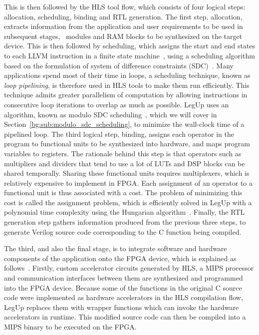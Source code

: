 This is then followed by the HLS tool flow, which consists of four logical
steps: allocation, scheduling, binding and RTL generation.  The first
step, allocation, extracts information from the application and user
requirements to be used in subsequent stages, \eg~modules and RAM blocks to
be synthesized on the target device.  This is then followed by scheduling,
which assigns the start and end states to each LLVM instruction in a
finite state machine~\cite{legup}, using a scheduling algorithm based on
the formulation of system of difference constraints (SDC)~\cite{legup,
canis13, cong06}.  Many applications spend most of their time in loops, a
scheduling technique, known as \emph{loop pipelining}, is therefore used
in HLS tools to make them run efficiently.  This technique admits greater
parallelism of computation by allowing instructions in consecutive loop
iterations to overlap as much as possible.  LegUp uses an algorithm,
known as modulo SDC scheduling~\cite{canis14}, which we will cover in
Section~\ref{bg:sub:modulo_sdc_scheduling}, to minimize the wall-clock time
of a pipelined loop.  The third logical step, binding, assigns each operator
in the program to functional units to be synthesized into hardware, and maps
program variables to registers.  The rationale behind this step is that
operators such as multipliers and dividers that tend to use a lot of LUTs and
DSP blocks can be shared temporally.  Sharing these functional units requires
multiplexers, which is relatively expensive to implement in FPGA\@.  Each
assignment of an operator to a functional unit is thus associated with a cost.
The problem of minimizing this cost is called the assignment problem, which
is efficiently solved in LegUp with a polynomial time complexity using the
Hungarian algorithm~\cite{canis13, kuhn10}.  Finally, the RTL generation step
gathers information produced from the previous three steps, to generate Verilog
source code corresponding to the C function being compiled.

The third, and also the final stage, is to integrate software and hardware
components of the application onto the FPGA device, which is explained as
follows~\cite{canis13}.  Firstly, custom accelerator circuits generated by HLS,
a MIPS processor and communication interfaces between them are synthesized and
programmed into the FPGA device.  Because some of the functions in the original
C source code were implemented as hardware accelerators in the HLS compilation
flow, LegUp replaces them with wrapper functions which can invoke the hardware
accelerators in runtime.  This modified source code can then be compiled into a
MIPS binary to be executed on the FPGA.


